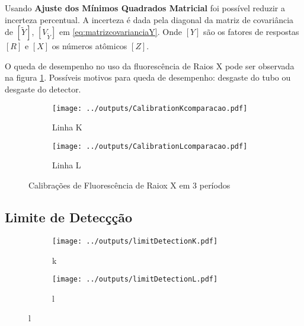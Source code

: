 Usando \textbf{Ajuste dos Mínimos Quadrados Matricial} foi possível
reduzir a incerteza percentual. 
A incerteza é dada pela diagonal da matriz de covariância 
de $[\tilde{Y}]$, $[V_{\tilde{Y}}]$ em \ref{eq:matrizcovarianciaY}.
Onde $[Y]$ são os fatores de respostas $[R]$ e $[X]$ os números atômicos $[Z]$.

%  

%  

O queda de desempenho no uso da fluorescência de Raios X pode ser observada 
na figura \ref{fig:compara_calibracao}. 
Possíveis motivos para queda de desempenho: desgaste do tubo ou desgaste do detector. 

\begin{figure}[H]
  \begin{subfigure}[b]{0.5\textwidth}
    \texttt{[image: ../outputs/CalibrationKcomparacao.pdf]}
    \caption{Linha K}
  \end{subfigure}%
  \begin{subfigure}[b]{0.5\textwidth}
    \texttt{[image: ../outputs/CalibrationLcomparacao.pdf]}
    \caption{Linha L}
  \end{subfigure}
  \caption{Calibrações de Fluorescência de Raiox X em 3 períodos \label{fig:compara_calibracao}}
\end{figure}

\subsection{Limite de Detecçção}

\begin{figure}[H]
  \caption{}
  \begin{subfigure}[b]{0.5\textwidth}
    \texttt{[image: ../outputs/limitDetectionK.pdf]}
    \caption{k}
  \end{subfigure}%
  \begin{subfigure}[b]{0.5\textwidth}
    \texttt{[image: ../outputs/limitDetectionL.pdf]}
    \caption{l}
  \end{subfigure}
\end{figure}

